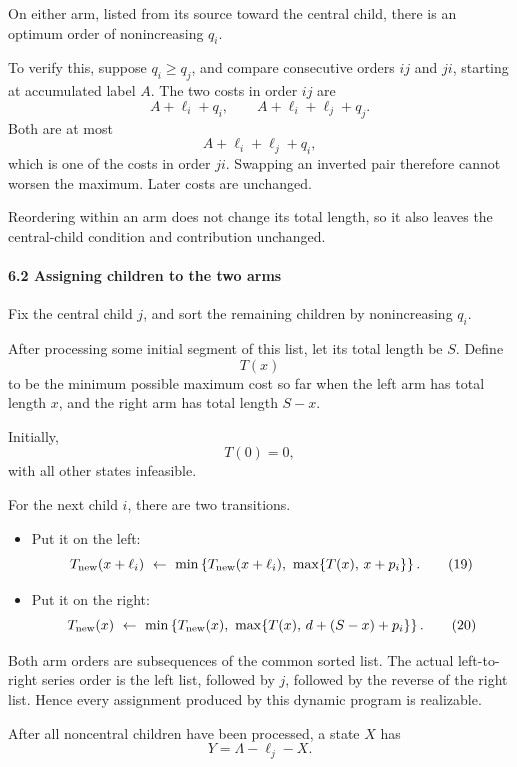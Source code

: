 \documentclass[
  11pt,
  a4paper,
]{article}
\providecommand{\tightlist}{%
  \setlength{\itemsep}{0pt}\setlength{\parskip}{0pt}}
\begin{document}
On either arm, listed from its source toward the central child, there is
an optimum order of nonincreasing \(q_i\).

To verify this, suppose \(q_i\ge q_j\), and compare consecutive orders
\(ij\) and \(ji\), starting at accumulated label \(A\). The two costs in
order \(ij\) are \[
A+\ell_i+q_i,\qquad
A+\ell_i+\ell_j+q_j.
\] Both are at most \[
A+\ell_i+\ell_j+q_i,
\] which is one of the costs in order \(ji\). Swapping an inverted pair
therefore cannot worsen the maximum. Later costs are unchanged.

Reordering within an arm does not change its total length, so it also
leaves the central-child condition and contribution unchanged.

\paragraph{6.2 Assigning children to the two
arms}\label{assigning-children-to-the-two-arms}

Fix the central child \(j\), and sort the remaining children by
nonincreasing \(q_i\).

After processing some initial segment of this list, let its total length
be \(S\). Define \[
T(x)
\] to be the minimum possible maximum cost so far when the left arm has
total length \(x\), and the right arm has total length \(S-x\).

Initially, \[
T(0)=0,
\] with all other states infeasible.

For the next child \(i\), there are two transitions.

\begin{itemize}
\tightlist
\item
  Put it on the left: \[
  T_{\rm new}(x+\ell_i)
  \ \leftarrow\
  \min\left\{
  T_{\rm new}(x+\ell_i),\
  \max\{T(x),\,x+p_i\}
  \right\}.
  \qquad\text{(19)}
  \]
\item
  Put it on the right: \[
  T_{\rm new}(x)
  \ \leftarrow\
  \min\left\{
  T_{\rm new}(x),\
  \max\{T(x),\,d+(S-x)+p_i\}
  \right\}.
  \qquad\text{(20)}
  \]
\end{itemize}

Both arm orders are subsequences of the common sorted list. The actual
left-to-right series order is the left list, followed by \(j\), followed
by the reverse of the right list. Hence every assignment produced by
this dynamic program is realizable.

After all noncentral children have been processed, a state \(X\) has \[
Y=\Lambda-\ell_j-X.
\]
\end{document}
